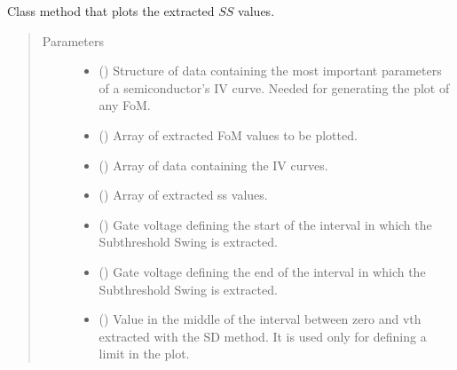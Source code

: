 \documentclass[letterpaper,10pt,english,openany, oneside]{sphinxmanual}
\begin{document}
\begin{fulllineitems}

\begin{fulllineitems}
\label{\detokenize{index:fompy.fom.ss_ext.plot}}
Class method that plots the extracted \(SS\) values.
\begin{quote}\begin{description}
\item[{Parameters}] \leavevmode\begin{itemize}
\item {} 
 () \textendash{} Structure of data containing the most important parameters of a semiconductor’s IV curve.
Needed for generating the plot of any FoM.

\item {} 
 () \textendash{} Array of extracted FoM values to be plotted.

\item {} 
 () \textendash{} Array of data containing the IV curves.

\item {} 
 () \textendash{} Array of extracted ss values.

\item {} 
 () \textendash{} Gate voltage defining the start of the interval in which the Subthreshold Swing is extracted.

\item {} 
 () \textendash{} Gate voltage defining the end of the interval in which the Subthreshold Swing is extracted.

\item {} 
 () \textendash{} Value in the middle of the interval between zero and vth extracted with the SD method.
It is used only for defining a limit in the plot.


\end{itemize}
\end{description}
\end{quote}
\end{fulllineitems}
\end{fulllineitems}
\end{document}
